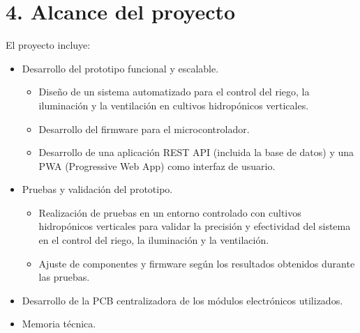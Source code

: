 \documentclass[
11pt, %
]{charter}
\begin{document}
\section{4. Alcance del proyecto}
\label{sec:alcance}




El proyecto incluye:
\begin{itemize}
	\item Desarrollo del prototipo funcional y escalable.
		\begin{itemize}
		\item Diseño de un sistema automatizado para el control del riego, la iluminación y la ventilación en cultivos hidropónicos verticales.
		\item Desarrollo del firmware para el microcontrolador.
		\item Desarrollo de una aplicación REST API (incluida la base de datos) y una PWA (Progressive Web App) como interfaz de usuario.
		\end{itemize}
	\item Pruebas y validación del prototipo.
		\begin{itemize}
		\item Realización de pruebas en un entorno controlado con cultivos hidropónicos verticales para validar la precisión y efectividad del sistema en el control del riego, la iluminación y la ventilación.
		\item Ajuste de componentes y firmware según los resultados obtenidos durante las pruebas.
		\end{itemize}
	\item Desarrollo de la PCB centralizadora de los módulos electrónicos utilizados.
	\item Memoria técnica.
	
\end{itemize}
\end{document}
